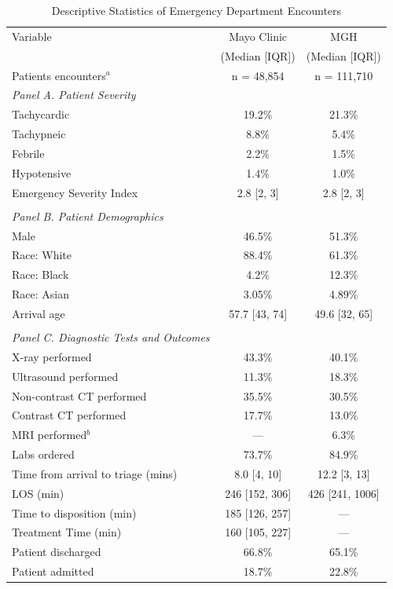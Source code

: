 \documentclass[,,blindrev]{informs}
\begin{document}
\begin{table}[t!]
\centering
\caption{Descriptive Statistics of Emergency Department Encounters}
\label{tab:desc_stats}
\begin{threeparttable}
\begin{tabular}{p{9cm}cc}
\toprule
Variable & Mayo Clinic & MGH \\
 & (Median [IQR]) & (Median [IQR]) \\
Patients encounters$^a$ & n = 48,854 & n = 111,710 \\
\midrule
\textit{Panel A. Patient Severity} & & \\
Tachycardic & 19.2\% & 21.3\% \\
Tachypneic & 8.8\% & 5.4\% \\
Febrile & 2.2\% & 1.5\% \\
Hypotensive & 1.4\% & 1.0\% \\
Emergency Severity Index & 2.8 [2, 3] & 2.8 [2, 3] \\
\\
\textit{Panel B. Patient Demographics} & & \\
Male & 46.5\% & 51.3\% \\
Race: White & 88.4\% & 61.3\% \\
Race: Black & 4.2\% & 12.3\% \\
Race: Asian & 3.05\% & 4.89\% \\
Arrival age & 57.7 [43, 74] & 49.6 [32, 65] \\
\\
\textit{Panel C. Diagnostic Tests and Outcomes} & & \\
X-ray performed & 43.3\% & 40.1\% \\
Ultrasound performed & 11.3\% & 18.3\% \\
Non-contrast CT performed & 35.5\% & 30.5\% \\
Contrast CT performed & 17.7\% & 13.0\% \\
MRI performed$^{b}$ & --- & 6.3\% \\
Labs ordered & 73.7\% & 84.9\% \\
Time from arrival to triage (mins) & 8.0 [4, 10] & 12.2 [3, 13] \\
LOS (min) & 246 [152, 306] & 426 [241, 1006] \\
Time to disposition (min) & 185 [126, 257] & --- \\
Treatment Time (min) & 160 [105, 227] & --- \\
Patient discharged & 66.8\% & 65.1\% \\
Patient admitted & 18.7\% & 22.8\% \\

\end{tabular}
\end{threeparttable}
\end{table}
\end{document}
